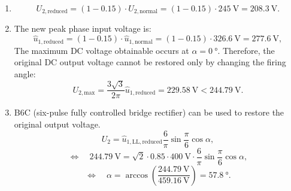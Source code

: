 \begin{solutionblock}
	\begin{enumerate}
		\renewcommand{\labelenumi}{\alph{enumi})}
		\item $$U_{2,\mathrm{reduced}}=(1-0.15) \cdot U_\mathrm{2,normal} = (1-0.15) \cdot \SI{245}{\volt} = \SI{208.3}{\volt}.$$
		\item The new peak phase input voltage is:
		      $$\hat{u}_{1,\mathrm{reduced}} = (1-0.15) \cdot \hat{u}_\mathrm{1,normal} = (1-0.15)\cdot \SI{326.6}{\volt} = \SI{277.6}{\volt},$$
		      The maximum DC voltage obtainable occurs at $\alpha=\SI{0}{\degree}$. Therefore, the original DC output voltage cannot be restored only by changing the firing angle:
		      $$U_{2,\mathrm{max}} = \frac{3\sqrt{3}}{2\pi}\hat{u}_{1,\mathrm{reduced}}
			      = \SI{229.58}{\volt} < \SI{244.79}{\volt}.$$
		\item B6C (six-pulse fully controlled bridge rectifier) can be used to restore the original output voltage.
		      $$U_2 = \hat{u}_{1,\mathrm{LL},\mathrm{reduced}}\frac{6}{\pi}\sin{\frac{\pi}{6}}\cos{\alpha},$$
		      $$\Leftrightarrow \quad \SI{244.79}{\volt} = \sqrt{2}\cdot0.85\cdot\SI{400}{\volt}\cdot\frac{6}{\pi}\sin{\frac{\pi}{6}}\cos{\alpha},$$
		      $$\Leftrightarrow \quad \alpha = \arccos\left(\frac{\SI{244.79}{\volt}}{\SI{459.16}{\volt}}\right) = \SI{57.8}{\degree}.$$
	\end{enumerate}
\end{solutionblock}


